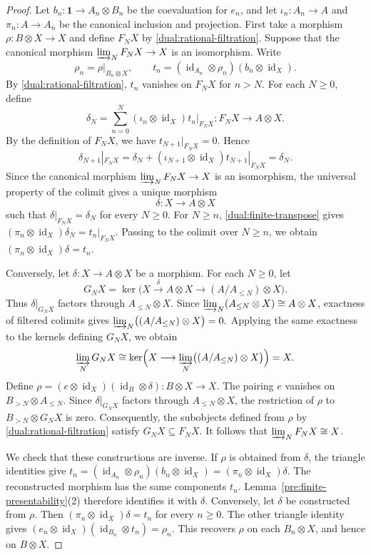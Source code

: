 \documentclass[11pt, a4paper]{article}
\numberwithin{equation}{section}
\newcommand{\one}{\mathbf 1}
\DeclareMathOperator{\id}{id}
\begin{document}
\begin{proof}

Let $b_n:\one\to A_n\otimes B_n$ be the coevaluation for $e_n$,
and let $\iota_n:A_n\to A$ and $\pi_n:A\to A_n$ be the
canonical inclusion and projection.
First take a morphism $\rho:B\otimes X\to X$ and define
$F_NX$ by \eqref{dual:rational-filtration}. Suppose that the canonical morphism
$\varinjlim_NF_NX\to X$ is an isomorphism. Write
\[
 \rho_n=\rho|_{B_n\otimes X},
 \qquad
 t_n=(\id_{A_n}\otimes\rho_n)(b_n\otimes\id_X).
\]
By \eqref{dual:rational-filtration}, $t_n$ vanishes on $F_NX$ for
$n>N$. For each $N\geq0$, define
\begin{equation}\label{dual:finite-transpose}
 \delta_N=
 \sum_{n=0}^{N}(\iota_n\otimes\id_X)t_n|_{F_NX}
 :F_NX\longrightarrow A\otimes X.
\end{equation}
By the definition of $F_NX$, we have
$t_{N+1}|_{F_NX}=0$. Hence
\[
 \delta_{N+1}|_{F_NX}
 =\delta_N+
   (\iota_{N+1}\otimes\id_X)t_{N+1}|_{F_NX}
 =\delta_N.
\]
Since the canonical morphism $\varinjlim_NF_NX\to X$ is an
isomorphism, the universal property of the colimit gives
a unique morphism
\[
 \delta:X\longrightarrow A\otimes X
\]
such that $\delta|_{F_NX}=\delta_N$ for every $N\geq0$.
For $N\geq n$, \eqref{dual:finite-transpose} gives
$(\pi_n\otimes\id_X)\delta_N=t_n|_{F_NX}$.
Passing to the colimit over $N\geq n$, we obtain
$(\pi_n\otimes\id_X)\delta=t_n$.


Conversely, let $\delta:X\to A\otimes X$ be a morphism.
For each $N\geq0$, let
\[
 G_NX=
 \ker\bigl(
 X\xrightarrow{\delta}A\otimes X
 \longrightarrow (A/A_{\leq N})\otimes X
 \bigr).
\]
Thus $\delta|_{G_NX}$ factors through $A_{\leq N}\otimes X$.
Since
$\varinjlim_N(A_{\leq N}\otimes X)\cong A\otimes X$,
exactness of filtered colimits gives
$
 \varinjlim_N\bigl((A/A_{\leq N})\otimes X\bigr)=0.
$
Applying the same exactness to the kernels defining $G_NX$,
we obtain
\[
 \varinjlim_NG_NX
 \cong
 \ker\Bigl(
 X\longrightarrow
 \varinjlim_N\bigl((A/A_{\leq N})\otimes X\bigr)
 \Bigr)
 =X.
\]
Define
$
 \rho=(e\otimes\id_X)(\id_B\otimes\delta):
 B\otimes X\longrightarrow X.
$
The pairing $e$ vanishes on $B_{>N}\otimes A_{\leq N}$.
Since $\delta|_{G_NX}$ factors through $A_{\leq N}\otimes X$,
the restriction of $\rho$ to $B_{>N}\otimes G_NX$ is zero.
Consequently, the subobjects defined from $\rho$ by
\eqref{dual:rational-filtration} satisfy $G_NX\subseteq F_NX$.
It follows that $\varinjlim_NF_NX\cong X$.


We check that these constructions are inverse.
If $\rho$ is obtained from $\delta$, the triangle identities give
$
 t_n
 =(\id_{A_n}\otimes\rho_n)(b_n\otimes\id_X)
 =(\pi_n\otimes\id_X)\delta.
$
The reconstructed morphism has the same components $t_n$.
Lemma~\ref{pre:finite-presentability}(2) therefore identifies
it with $\delta$.
Conversely, let $\delta$ be constructed from $\rho$.
Then $(\pi_n\otimes\id_X)\delta=t_n$ for every $n\geq0$.
The other triangle identity gives
$
 (e_n\otimes\id_X)(\id_{B_n}\otimes t_n)=\rho_n.
$
This recovers $\rho$ on each
$B_n\otimes X$, and hence on $B\otimes X$.




\end{proof}
\end{document}
